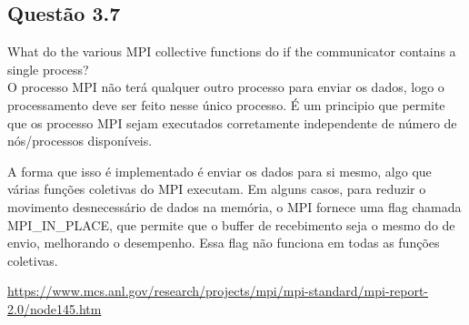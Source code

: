 

\subsection{Questão 3.7}

What do the various MPI collective functions do if the communicator contains a single process? \\

O processo MPI não terá qualquer outro processo para enviar os dados, logo o processamento deve ser feito nesse único processo. É um principio que permite que os processo MPI sejam executados corretamente independente de número de nós/processos disponíveis.

A forma que isso é implementado é enviar os dados para si mesmo, algo que várias funções coletivas do MPI executam. Em alguns casos, para reduzir o movimento desnecessário de dados na memória, o MPI fornece uma flag chamada MPI\_IN\_PLACE, que permite que o buffer de recebimento seja o mesmo do de envio, melhorando o desempenho. Essa flag não funciona em todas as funções coletivas.

\url{https://www.mcs.anl.gov/research/projects/mpi/mpi-standard/mpi-report-2.0/node145.htm}



